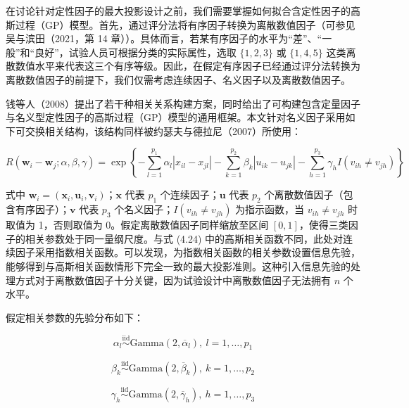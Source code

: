 \documentclass{ctexart}
\begin{document}
在讨论针对定性因子的最大投影设计之前，我们需要掌握如何拟合含定性因子的高斯过程（GP）模型。首先，通过评分法将有序因子转换为离散数值因子（可参见吴与滨田（2021，第 14 章））。具体而言，若某有序因子的水平为“差”、“一般”和“良好”，试验人员可根据分类的实际属性，选取 $\{1,2,3\}$ 或 $\{1,4,5\}$ 这类离散数值水平来代表这三个有序等级。因此，在假定有序因子已经通过评分法转换为离散数值因子的前提下，我们仅需考虑连续因子、名义因子以及离散数值因子。

钱等人（2008）提出了若干种相关关系构建方案，同时给出了可构建包含定量因子与名义型定性因子的高斯过程（GP）模型的通用框架。本文针对名义因子采用如下可交换相关结构，该结构同样被约瑟夫与德拉尼（2007）所使用：

\begin{equation*}
R(\boldsymbol{w}_i -\boldsymbol{w}_j; \alpha, \beta, \gamma) = \exp\left\{-\sum_{l=1}^{p_1}\alpha_l|x_{il}-x_{jl}| -\sum_{k=1}^{p_2}\beta_k|u_{ik}-u_{jk}| -\sum_{h=1}^{p_3}\gamma_hI(v_{ih} \neq v_{jh})\right\}
\tag{4.31}
\end{equation*}

式中 $\boldsymbol{w}_i = (\boldsymbol{x}_i, \boldsymbol{u}_i, \boldsymbol{v}_i)$；$\boldsymbol{x}$ 代表 $p_1$ 个连续因子；$\boldsymbol{u}$ 代表 $p_2$ 个离散数值因子（包含有序因子）；$\boldsymbol{v}$ 代表 $p_3$ 个名义因子；$I(v_{ih} \neq v_{jh})$ 为指示函数，当 $v_{ih} \neq v_{jh}$ 时取值为 1，否则取值为 0。假定离散数值因子同样缩放至区间 $[0,1]$，使得三类因子的相关参数处于同一量纲尺度。与式 (4.24) 中的高斯相关函数不同，此处对连续因子采用指数相关函数。可以发现，为指数相关函数的相关参数设置信息先验，能够得到与高斯相关函数情形下完全一致的最大投影准则。这种引入信息先验的处理方式对于离散数值因子十分关键，因为试验设计中离散数值因子无法拥有 $n$ 个水平。

假定相关参数的先验分布如下：

\begin{equation*}
\alpha_l \stackrel{\text{iid}}{\sim} \mathrm{Gamma}(2, \overline{\alpha}_l),\ l = 1, \dots, p_1
\end{equation*}

\begin{equation*}
\beta_k \stackrel{\text{iid}}{\sim} \mathrm{Gamma}(2, \overline{\beta}_k),\ k = 1, \dots, p_2
\end{equation*}

\begin{equation*}
\gamma_h \stackrel{\text{iid}}{\sim} \mathrm{Gamma}(2, \overline{\gamma}_h),\ h = 1, \dots, p_3
\end{equation*}
\end{document}
